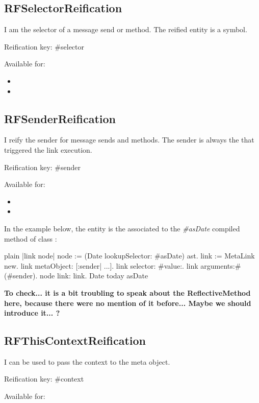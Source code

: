 \documentclass[10pt,twoside,english]{_support/latex/sbabook/sbabook}
\begin{document}
\subsection{RFSelectorReification}
I am the selector of a message send or method. The reified entity is a symbol.

Reification key: \#selector

Available for:

\begin{itemize}
\item {}
\item {}
\end{itemize}
\subsection{RFSenderReification}
I reify the sender for message sends and methods. The sender is always the  that triggered the link execution.

Reification key: \#sender

Available for:

\begin{itemize}
\item {}
\item {}
\end{itemize}

In the example below, the  entity is the  associated to the \textit{\#asDate} compiled method of class :

\begin{displaycode}{plain}
|link node|
node := (Date lookupSelector: #asDate) ast.
link := MetaLink new.
link metaObject: [:sender| ...].
link selector: #value:.
link arguments:#(#sender).
node link: link.
Date today asDate
\end{displaycode}

\textbf{To check... it is a bit troubling to speak about the ReflectiveMethod here, because there were no mention of it before... Maybe we should introduce it... ?}
\subsection{RFThisContextReification}
I can be used to pass the context to the meta object.

Reification key: \#context

Available for:
\end{document}
